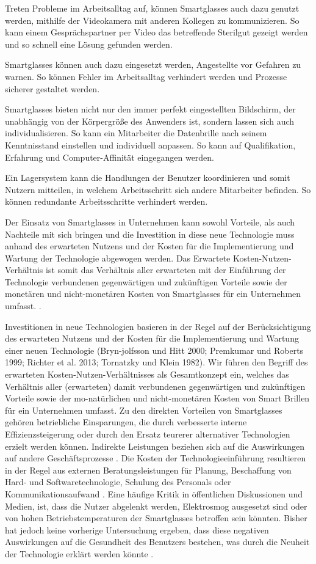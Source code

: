 Treten Probleme im Arbeitsalltag auf, können Smartglasses auch dazu genutzt werden, mithilfe der Videokamera mit anderen Kollegen zu kommunizieren. So kann einem Gesprächspartner per Video das betreffende Sterilgut gezeigt werden und so schnell eine Lösung gefunden werden.

Smartglasses können auch dazu eingesetzt werden, Angestellte vor Gefahren zu warnen. So können Fehler im Arbeitsalltag verhindert werden und Prozesse sicherer gestaltet werden.

Smartglasses bieten nicht nur den immer perfekt eingestellten Bildschirm, der unabhängig von der Körpergröße des Anwenders ist, sondern lassen sich auch individualisieren. So kann ein Mitarbeiter die Datenbrille nach seinem Kenntnisstand einstellen und individuell anpassen. So kann auf Qualifikation, Erfahrung und Computer-Affinität eingegangen werden.

Ein Lagersystem kann die Handlungen der Benutzer koordinieren und somit Nutzern mitteilen, in welchem Arbeitsschritt sich andere Mitarbeiter befinden. So können redundante Arbeitsschritte verhindert werden. 

Der Einsatz von Smartglasses in Unternehmen kann sowohl Vorteile, als auch Nachteile mit sich bringen und die Investition in diese neue Technologie muss anhand des erwarteten Nutzens und der Kosten für die Implementierung und Wartung der Technologie abgewogen werden. Das Erwartete Kosten-Nutzen-Verhältnis ist somit das Verhältnis aller erwarteten mit der Einführung der Technologie verbundenen gegenwärtigen und zukünftigen Vorteile sowie der monetären und nicht-monetären Kosten von Smartglasses für ein Unternehmen umfasst. \cite{Hein2016}. 

Investitionen in neue Technologien basieren in der Regel auf der Berücksichtigung des erwarteten Nutzens und der Kosten für die Implementierung und Wartung einer neuen Technologie (Bryn-jolfsson und Hitt 2000; Premkumar und Roberts 1999; Richter et al. 2013; Tornatzky und Klein 1982). Wir führen den Begriff des erwarteten Kosten-Nutzen-Verhältnisses als Gesamtkonzept ein, welches das Verhältnis aller (erwarteten) damit verbundenen gegenwärtigen und zukünftigen Vorteile sowie der mo-natürlichen und nicht-monetären Kosten von Smart Brillen für ein Unternehmen umfasst. Zu den direkten Vorteilen von Smartglasses gehören betriebliche Einsparungen, die durch verbesserte interne Effizienzsteigerung oder durch den Ersatz teurerer alternativer Technologien erzielt werden können. Indirekte Leistungen beziehen sich auf die Auswirkungen auf andere Geschäftsprozesse \cite{Hein2016}.
Die Kosten der Technologieeinführung resultieren in der Regel aus externen Beratungsleistungen für Planung, Beschaffung von Hard- und Softwaretechnologie, Schulung des Personals oder Kommunikationsaufwand \cite{Hein2016}. Eine häufige Kritik in öffentlichen Diskussionen und Medien, ist, dass die Nutzer abgelenkt werden, Elektrosmog ausgesetzt sind oder von hohen Betriebstemperaturen der Smartglasses betroffen sein könnten. Bisher hat jedoch keine vorherige Untersuchung ergeben, dass diese negativen Auswirkungen auf die Gesundheit des Benutzers bestehen, was durch die Neuheit der Technologie erklärt werden könnte \cite{Hein2016}.
%
%
